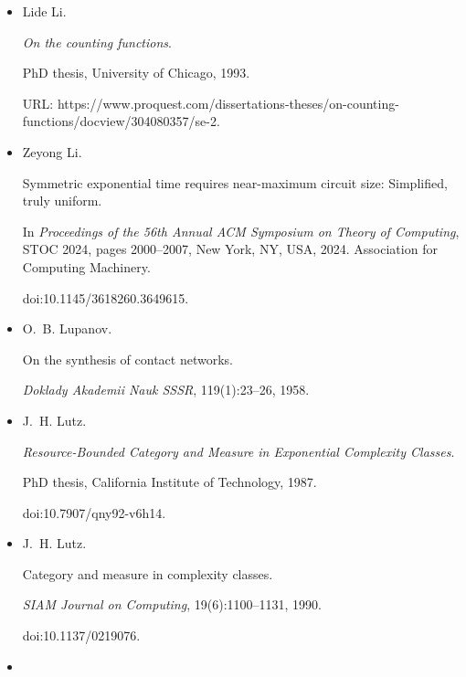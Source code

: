 \documentclass[10pt,a4paper]{article}
\begin{document}
\begin{itemize}
\item[] 
[45]

Lide Li.


\emph{On the counting functions}.


PhD thesis, University of Chicago, 1993.


URL:
https://www.proquest.com/dissertations-theses/on-counting-functions/docview/304080357/se-2.





\item[] 
[46]

Zeyong Li.


Symmetric exponential time requires near-maximum circuit size:
Simplified, truly uniform.


In \emph{Proceedings of the 56th Annual ACM Symposium on Theory of
Computing}, STOC 2024, pages 2000–2007, New York, NY, USA, 2024. Association
for Computing Machinery.


doi:10.1145/3618260.3649615.





\item[] 
[47]

O. B. Lupanov.


On the synthesis of contact networks.


\emph{Doklady Akademii Nauk SSSR}, 119(1):23–26, 1958.





\item[] 
[48]

J. H. Lutz.


\emph{Resource-Bounded Category and Measure in Exponential Complexity
Classes}.


PhD thesis, California Institute of Technology, 1987.


doi:10.7907/qny92-v6h14.





\item[] 
[49]

J. H. Lutz.


Category and measure in complexity classes.


\emph{SIAM Journal on Computing}, 19(6):1100–1131, 1990.


doi:10.1137/0219076.





\item[] 
[50]


\end{itemize}
\end{document}
